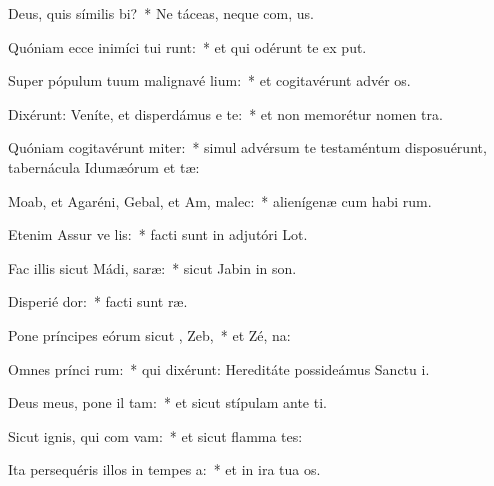 \item Deus, quis símilis  bi?~* Ne táceas, neque com, us.
\item Quóniam ecce inimíci tui runt:~* et qui odérunt te ex put.
\item Super pópulum tuum malignavé lium:~* et cogitavérunt advér  os.
\item Dixérunt: Veníte, et disperdámus e  te:~* et non memorétur nomen  tra.
\item Quóniam cogitavérunt miter:~* simul advérsum te testaméntum disposuérunt, tabernácula Idumæórum et tæ:
\item Moab, et Agaréni, Gebal, et Am,  malec:~* alienígenæ cum habi rum.
\item Etenim Assur ve  lis:~* facti sunt in adjutóri  Lot.
\item Fac illis sicut Mádi,  saræ:~* sicut Jabin in  son.
\item Disperié  dor:~* facti sunt   ræ.
\item Pone príncipes eórum sicut ,  Zeb,~* et Zé,  na:
\item Omnes prínci rum:~* qui dixérunt: Hereditáte possideámus Sanctu i.
\item Deus meus, pone il  tam:~* et sicut stípulam ante  ti.
\item Sicut ignis, qui com vam:~* et sicut flamma  tes:
\item Ita persequéris illos in tempes a:~* et in ira tua  os.
